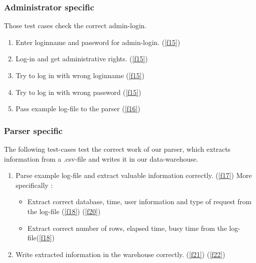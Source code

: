 \subsubsection{Administrator specific}

Those test cases check the correct admin-login.

\begin{enumerate}[resume]

\item Enter loginname and password for admin-login. (\ref{f15})

\item Log-in and get administrative rights. (\ref{f15})

\item Try to log in with wrong loginname (\ref{f15})

\item Try to log in with wrong password (\ref{f15})

\item Pass example log-file to the parser (\ref{f16})

\end{enumerate}

\subsubsection{Parser specific}

The following test-cases test the correct work of our parser, which extracts information from a .csv-file and writes 
it in our data-warehouse.

\begin{enumerate}[resume]

\item Parse example log-file and extract valuable information correctly. (\ref{f17}) More specifically :

\begin{itemize}

\item Extract correct database, time, user information and type of request from the log-file (\ref{f18}) (\ref{f20})

\item Extract correct number of rows, elapsed time, busy time from the log-file(\ref{f18})

\end{itemize}

\item Write extracted information in the warehouse correctly. (\ref{f21}) (\ref{f22})

\end{enumerate}



